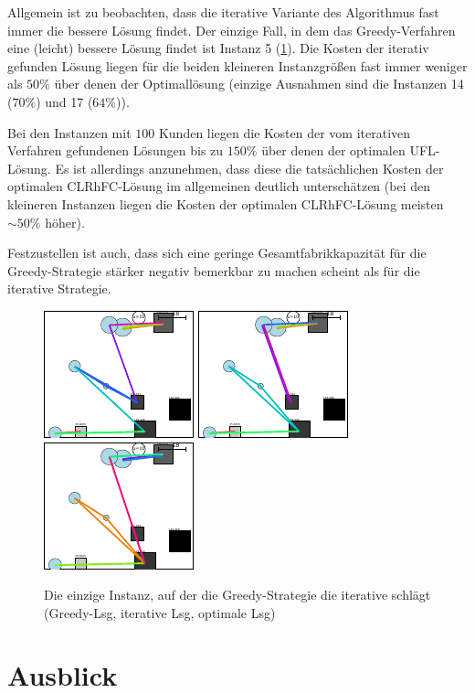 \documentclass[a4paper,ngerman,11pt,bibtotoc]{scrartcl}
\theoremstyle{definition}
\theoremstyle{plain}
\theoremstyle{remark}
\newcommand{\CLRHFC}{CLRhFC}
\newcommand{\UFL}{UFL}
\begin{document}
	Allgemein ist zu beobachten, dass die iterative Variante des Algorithmus fast immer die bessere Lösung findet. Der einzige Fall, in dem das Greedy-Verfahren eine (leicht) bessere Lösung findet ist Instanz 5 (\cref{fig:GreedyBesser}). Die Kosten der iterativ gefunden Lösung liegen für die beiden kleineren Instanzgrößen fast immer weniger als $50\%$ über denen der Optimallösung (einzige Ausnahmen sind die Instanzen 14 ($70\%$) und 17 ($64\%$)).
	
	Bei den Instanzen mit $100$ Kunden liegen die Kosten der vom iterativen Verfahren gefundenen Lösungen bis zu $150\%$ über denen der optimalen \UFL-Lösung. Es ist allerdings anzunehmen, dass diese die tatsächlichen Kosten der optimalen \CLRHFC-Lösung im allgemeinen deutlich unterschätzen (bei den kleineren Instanzen liegen die Kosten der optimalen \CLRHFC-Lösung meisten $\sim 50\%$ höher). 
	
	Festzustellen ist auch, dass sich eine geringe Gesamtfabrikkapazität für die Greedy-Strategie stärker negativ bemerkbar zu machen scheint als für die iterative Strategie. 
	
	\begin{figure}[h]
		\includegraphics[width=.3\textwidth]{bilder/GreedyBesser-Greedy.pdf}
		\includegraphics[width=.3\textwidth]{bilder/GreedyBesser-It.pdf}
		\includegraphics[width=.3\textwidth]{bilder/GreedyBesser-OPT.pdf}
		\caption{Die einzige Instanz, auf der die Greedy-Strategie die iterative schlägt \\ (Greedy-Lsg, iterative Lsg, optimale Lsg)}\label{fig:GreedyBesser}
	\end{figure}

\section*{Ausblick}
	
	
	

\newpage	
\listoftodos

\newpage
\nocite{*}
\printbibliography		
			
\end{document}
